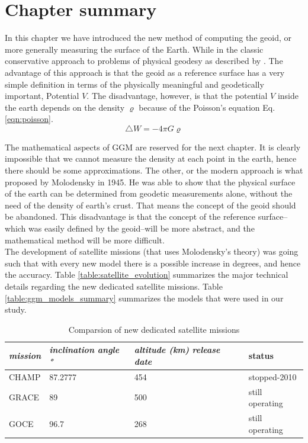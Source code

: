  
 \section{Chapter summary}
 
 In this chapter we have introduced the new method of computing the geoid, or more generally measuring the surface of the Earth. While in the classic conservative approach to problems of physical geodesy as described by \cite{hoffmann}. The advantage of this approach is that the geoid as a reference surface has a very simple definition in terms of the physically meaningful and geodetically important, Potential $V$. The disadvantage, however, is that the potential $V$ inside the earth depends on the  density $\varrho$ because of the Poisson's equation Eq. \eqref{eqn:poisson}. 
 \begin{equation}
 \label{eqn:poisson}
	 \triangle W = - 4 \pi G \varrho
 \end{equation} 
 
 The mathematical aspects of GGM are reserved for the next chapter. It is clearly impossible that we cannot measure the density at each point in the earth, hence there should be some approximations. The other, or the modern approach is what proposed by Molodensky in 1945. He was able to show that the physical surface of the earth can be determined from geodetic measurements alone, without the need of the density of earth's crust. That means the concept of the geoid should be abandoned. This disadvantage is that the concept of the reference surface--which was easily defined by the geoid--will be more abstract, and the mathematical method will be more difficult.
 \\
 The development of satellite missions (that uses Molodensky's theory) was going such that with every new model there is a possible increase in degrees, and hence the accuracy. Table \ref{table:satellite_evolution} summarizes the major technical details regarding the new dedicated satellite missions. Table \ref{table:ggm_models_summary} summarizes the models that were used in our study. 
 
 \begin{table}[]
 	\centering
 	\caption{Comparsion of new dedicated satellite missions}
 	\label{table:satellite_missions}
 	\begin{tabular}{@{}llll@{}}
 		\toprule
 		\emph{mission} & \emph{inclination angle \si{\degree}} & \emph{altitude (km)} \emph{release date} & status\\ \midrule
 		
 		CHAMP & 87.2777 & 454 & stopped-2010 \\
 		GRACE & 89 & 500 & still operating\\
 		GOCE & 96.7 & 268& still operating\\ \bottomrule
 		
 	\end{tabular}
 \end{table}
 
